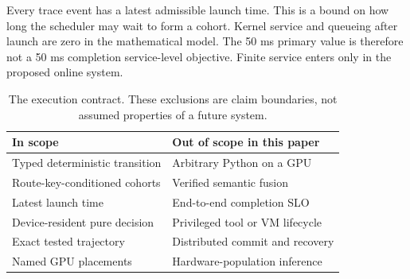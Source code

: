 Every trace event has a latest admissible launch time. This is a bound on how
long the scheduler may wait to form a cohort. Kernel service and queueing after
launch are zero in the mathematical model. The 50 ms primary value is therefore
not a 50 ms completion service-level objective. Finite service enters only in
the proposed online system.

\begin{table}[t]
  \centering
  \footnotesize
  \begin{tabularx}{\columnwidth}{@{}lX@{}}
    \toprule
    In scope & Out of scope in this paper \\
    \midrule
    Typed deterministic transition & Arbitrary Python on a GPU \\
    Route-key-conditioned cohorts & Verified semantic fusion \\
    Latest launch time & End-to-end completion SLO \\
    Device-resident pure decision & Privileged tool or VM lifecycle \\
    Exact tested trajectory & Distributed commit and recovery \\
    Named GPU placements & Hardware-population inference \\
    \bottomrule
  \end{tabularx}
  \caption{The execution contract. These exclusions are claim boundaries, not
  assumed properties of a future system.}
  \label{tab:scope}
\end{table}

